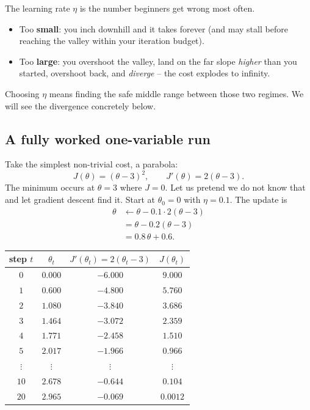 \begin{trapbox}
The learning rate $\eta$ is the number beginners get wrong most often.
\begin{itemize}
  \item Too \textbf{small}: you inch downhill and it takes forever (and may stall
        before reaching the valley within your iteration budget).
  \item Too \textbf{large}: you overshoot the valley, land on the far slope
        \emph{higher} than you started, overshoot back, and \emph{diverge} --
        the cost explodes to infinity.
\end{itemize}
Choosing $\eta$ means finding the safe middle range between those two regimes. We will see the divergence concretely below.
\end{trapbox}

\subsection{A fully worked one-variable run}

Take the simplest non-trivial cost, a parabola:
\[
  J(\theta) = (\theta - 3)^2, \qquad J'(\theta) = 2(\theta - 3).
\]
The minimum occurs at $\theta = 3$ where $J = 0$. Let us pretend we do not
know that and let gradient descent find it. Start at $\theta_0 = 0$ with
$\eta = 0.1$. The update is
\begin{align*}
  \theta &\leftarrow \theta - 0.1\cdot 2(\theta-3) \\
         &= \theta - 0.2(\theta-3) \\
         &= 0.8\,\theta + 0.6.
\end{align*}

\begin{center}
\begin{tabular}{cccc}
\toprule
step $t$ & $\theta_t$ & $J'(\theta_t)=2(\theta_t-3)$ & $J(\theta_t)$ \\
\midrule
$0$ & $0.000$ & $-6.000$ & $9.000$ \\
$1$ & $0.600$ & $-4.800$ & $5.760$ \\
$2$ & $1.080$ & $-3.840$ & $3.686$ \\
$3$ & $1.464$ & $-3.072$ & $2.359$ \\
$4$ & $1.771$ & $-2.458$ & $1.510$ \\
$5$ & $2.017$ & $-1.966$ & $0.966$ \\
$\vdots$ & $\vdots$ & $\vdots$ & $\vdots$ \\
$10$ & $2.678$ & $-0.644$ & $0.104$ \\
$20$ & $2.965$ & $-0.069$ & $0.0012$ \\
\bottomrule
\end{tabular}
\end{center}

